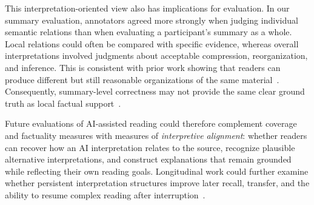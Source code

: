 \documentclass[manuscript,review,anonymous]{acmart}
\begin{document}
This interpretation-oriented view also has implications for evaluation. In our summary evaluation, annotators agreed more strongly when judging individual semantic relations than when evaluating a participant's summary as a whole. Local relations could often be compared with specific evidence, whereas overall interpretations involved judgments about acceptable compression, reorganization, and inference. This is consistent with prior work showing that readers can produce different but still reasonable organizations of the same material~\cite{abstractexplorer}. Consequently, summary-level correctness may not provide the same clear ground truth as local factual support~\cite{nenkova-passonneau-2004-evaluating}.

Future evaluations of AI-assisted reading could therefore complement coverage and factuality measures with measures of \textit{interpretive alignment}: whether readers can recover how an AI interpretation relates to the source, recognize plausible alternative interpretations, and construct explanations that remain grounded while reflecting their own reading goals. Longitudinal work could further examine whether persistent interpretation structures improve later recall, transfer, and the ability to resume complex reading after interruption~\cite{garden_of_papers,Synergi,threddy}.






\end{document}
